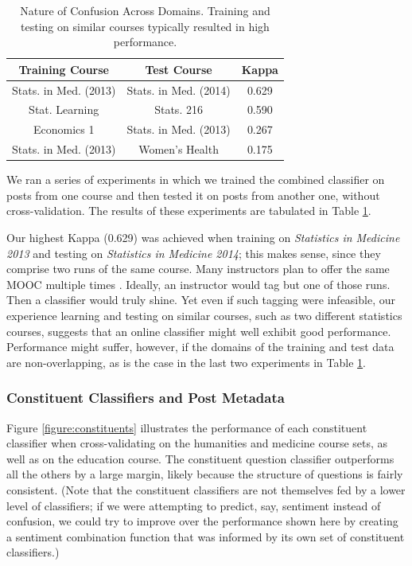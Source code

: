 \documentclass{edm_template}
\begin{document}
\begin{table}[h!]
       \centering
       \begin{tabular}{|c|c|c|}
       \hline
       Training Course                & Test Course                    & Kappa \\ \hline
       Stats. in Med. (2013)  & Stats. in Med. (2014)  & 0.629 \\ \hline
       Stat. Learning           & Stats. 216                 & 0.590 \\ \hline
       Economics 1                    & Stats. in Med. (2013)  & 0.267 \\ \hline
       Stats. in Med. (2013)  & Women's Health                 & 0.175 \\ \hline
       \end{tabular}
       \caption{\textnormal{
       Nature of Confusion Across Domains. Training and testing on similar courses typically resulted in high performance.
       }} 
       \label{table:across_courses} %
\end{table}

We ran a series of experiments in which we trained the combined classifier on posts from one course and then tested it on posts from another one, without cross-validation. The results of these experiments are tabulated in Table \ref{table:across_courses}. 

Our highest Kappa (0.629) was achieved when training on \emph{Statistics in Medicine 2013} and testing on \emph{Statistics in Medicine 2014}; this makes sense, since they comprise two runs of the same course. Many instructors plan to offer the same MOOC multiple times \cite{hollands2014moocs}. Ideally, an instructor would tag but one of those runs. Then a classifier would truly shine. Yet even if such tagging were infeasible, our experience learning and testing on similar courses, such as two different statistics courses, suggests that an online classifier might well exhibit good performance. Performance might suffer, however, if the domains of the training and test data are non-overlapping, as is the case in the last two experiments in Table \ref{table:across_courses}.

\subsubsection{Constituent Classifiers and Post Metadata}

Figure \ref{figure:constituents} illustrates the performance of each constituent classifier when cross-validating on the humanities and medicine course sets, as well as on the education course. The constituent question classifier outperforms all the others by a large margin, likely because the structure of questions is fairly consistent. (Note that the constituent classifiers are not themselves fed by a lower level of classifiers; if we were attempting to predict, say, sentiment instead of confusion, we could try to improve over the performance shown here by creating a sentiment combination function that was informed by its own set of constituent classifiers.)
\end{document}
